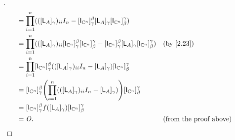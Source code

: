 \begin{proof}[]
\begin{align*}
         & = \prod_{i = 1}^n (([\L_A]_{\gamma})_{i i} I_n - [\IT[\C^n]]_{\gamma}^{\beta} [\L_A]_{\gamma} [\IT[\C^n]]_{\beta}^{\gamma})                                                                                          \\
         & = \prod_{i = 1}^n (([\L_A]_{\gamma})_{i i} [\IT[\C^n]]_{\gamma}^{\beta} [\IT[\C^n]]_{\beta}^{\gamma} - [\IT[\C^n]]_{\gamma}^{\beta} [\L_A]_{\gamma} [\IT[\C^n]]_{\beta}^{\gamma}) &  & \text{(by \cref{2.23})}       \\
         & = \prod_{i = 1}^n [\IT[\C^n]]_{\gamma}^{\beta} (([\L_A]_{\gamma})_{i i} I_n - [\L_A]_{\gamma}) [\IT[\C^n]]_{\beta}^{\gamma}                                                                                          \\
         & = [\IT[\C^n]]_{\gamma}^{\beta} \pa{\prod_{i = 1}^n (([\L_A]_{\gamma})_{i i} I_n - [\L_A]_{\gamma})} [\IT[\C^n]]_{\beta}^{\gamma}                                                                                     \\
         & = [\IT[\C^n]]_{\gamma}^{\beta} f([\L_A]_{\gamma}) [\IT[\C^n]]_{\beta}^{\gamma}                                                                                                                                       \\
         & = \zm.                                                                                                                                                                            &  & \text{(from the proof above)}
  \end{align*}
\end{proof}
